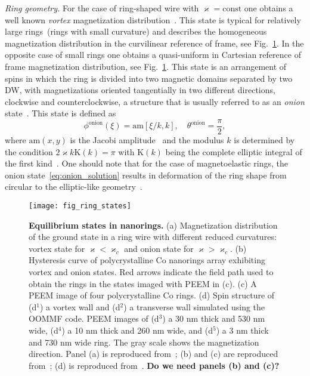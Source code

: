 {\it Ring geometry.} For the case of ring-shaped wire with $\varkappa=\text{const}$ one obtains a well known \textit{vortex} magnetization distribution~\cite{Klaui03a,Sheka15}. This state is typical for relatively large rings~(rings with small curvature) and describes the homogeneous magnetization distribution in the curvilinear reference of frame, see Fig.~\ref{fig:ring_states}. In the opposite case of small rings one obtains a quasi-uniform in Cartesian reference of frame magnetization distribution, see Fig.~\ref{fig:ring_states}. This state is an arrangement of spins in which the ring is divided into two magnetic domains separated by two DW, with magnetizations oriented tangentially in two different directions, clockwise and counterclockwise, a structure that is usually referred to as an \textit{onion} state~\cite{Klaui03a}. This state is defined as~\cite{Sheka15}
\begin{equation}\label{eq:onion_solution}
\phi^\text{onion}(\xi)=\text{am}\left[\xi/k,k\right],\quad \theta^\text{onion}=\frac{\pi}{2},
\end{equation}
where $\text{am}\left(x,y\right)$ is the Jacobi amplitude~\cite{NIST10} and the modulus $k$ is determined by the condition $2\varkappa k \mathrm{K}(k)=\pi$ with $\mathrm{K}(k)$ being the complete elliptic integral of the first kind~\cite{NIST10}. One should note that for the case of magnetoelastic rings, the onion state~\eqref{eq:onion_solution} results in deformation of the ring shape from circular to the elliptic-like geometry~\cite{Gaididei19}.

\begin{figure}[t]
	\texttt{[image: fig\_ring\_states]}
	\caption{\label{fig:ring_states}%
		\textbf{Equilibrium states in nanorings.} (a) Magnetization distribution of the ground state in a ring wire with different reduced curvatures: vortex state for $\varkappa<\varkappa_c$ and onion state for $\varkappa>\varkappa_c$. (b) Hysteresis curve of polycrystalline  Co nanorings array exhibiting vortex and onion states. Red arrows indicate the field path used to obtain the rings in the states imaged with PEEM in (c). (c) A PEEM image of	four polycrystalline Co rings. (d) Spin structure of (d$^1$) a vortex wall and (d$^2$) a transverse wall simulated using the OOMMF code. PEEM images of (d$^3$) a 30 nm thick and 530 nm wide, (d$^4$) a 10 nm thick and 260 nm wide, and	(d$^5$) a 3 nm thick and 730 nm wide ring. The gray scale shows	the magnetization direction. Panel (a) is reproduced from~\cite{Sheka15}; (b) and (c) are reproduced from~\cite{Klaui03a}; (d) is reproduced from~\cite{Laufenberg06}. {\color{red}\bf Do we need panels (b) and (c)?}}
\end{figure}

